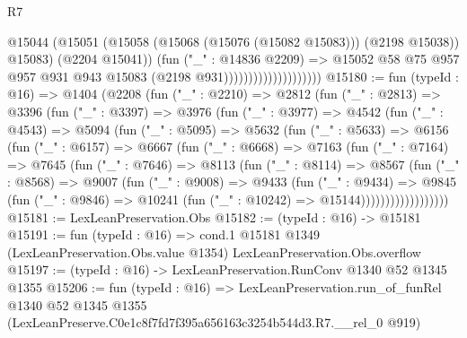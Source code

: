 \begin{lexlean}{R7}
\begin{coremodule}
                                        @15044
                                          (@15051
                                            (@15058
                                              (@15068 (@15076 (@15082 @15083)))
                                              (@2198 @15038))
                                            @15083)
                                          (@2204 @15041))
                                        (fun ("_" : @14836 @2209) =>
                                        @15052
                                          @58
                                          @75
                                          @957
                                          @957
                                          @931
                                          @943
                                          @15083
                                          (@2198 @931))))))))))))))))))))
@15180 := fun (typeId : @16) =>
  @1404
    (@2208
      (fun ("_" : @2210) =>
      @2812
        (fun ("_" : @2813) =>
        @3396
          (fun ("_" : @3397) =>
          @3976
            (fun ("_" : @3977) =>
            @4542
              (fun ("_" : @4543) =>
              @5094
                (fun ("_" : @5095) =>
                @5632
                  (fun ("_" : @5633) =>
                  @6156
                    (fun ("_" : @6157) =>
                    @6667
                      (fun ("_" : @6668) =>
                      @7163
                        (fun ("_" : @7164) =>
                        @7645
                          (fun ("_" : @7646) =>
                          @8113
                            (fun ("_" : @8114) =>
                            @8567
                              (fun ("_" : @8568) =>
                              @9007
                                (fun ("_" : @9008) =>
                                @9433
                                  (fun ("_" : @9434) =>
                                  @9845
                                    (fun ("_" : @9846) =>
                                    @10241 (fun ("_" : @10242) => @15144))))))))))))))))))
@15181 := LexLeanPreservation.Obs
@15182 := (typeId : @16) -> @15181
@15191 := fun (typeId : @16) =>
  cond.{1} @15181 @1349 (LexLeanPreservation.Obs.value @1354) LexLeanPreservation.Obs.overflow
@15197 := (typeId : @16) -> LexLeanPreservation.RunConv @1340 @52 @1345 @1355
@15206 := fun (typeId : @16) =>
  LexLeanPreservation.run_of_funRel
    @1340
    @52
    @1345
    @1355
    (LexLeanPreserve.C0e1c8f7fd7f395a656163c3254b544d3.R7.__rel_0 @919)
\end{coremodule}
\end{lexlean}
